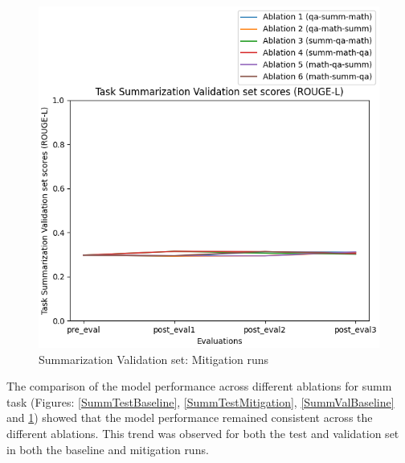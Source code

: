 \begin{figure}[H]
\begin{minipage}{0.45\textwidth}
        \includegraphics[width=1.1\textwidth]{Figures/results/trace_mitigation_graphs/task_eval/summ_val_Validation_mitigation.png} %
        \captionsetup{width=1.1\textwidth}
        \caption{Summarization Validation set: Mitigation runs}
        \label{SummValMitigation}
    \end{minipage}
\end{figure}
The comparison of the model performance across different ablations for summ task (Figures: \ref{SummTestBaseline}, \ref{SummTestMitigation}, \ref{SummValBaseline} and \ref{SummValMitigation}) showed that the model performance remained consistent across the different ablations. This trend was observed for both the test and validation set in both the baseline and mitigation runs. 

